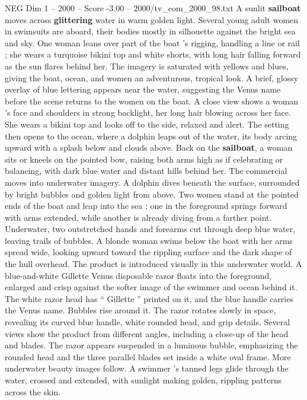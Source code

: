 \begin{textsample}{NEG Dim 1 – 2000 – Score -3.00 – 2000/tv\_com\_2000\_98.txt}  \label{ex:f1_neg_061}
A sunlit \textbf{sailboat} moves across \textbf{glittering} water in warm golden light.
Several young adult women in swimsuits are aboard, their bodies mostly in silhouette against the bright sea and sky.
One woman leans over part of the boat ’s rigging, handling a line or rail ; she wears a turquoise bikini top and white shorts, with long hair falling forward as the sun flares behind her.
The imagery is saturated with yellows and blues, giving the boat, ocean, and women an adventurous, tropical look.
A brief, glossy overlay of blue lettering appears near the water, suggesting the Venus name before the scene returns to the women on the boat.
A close view shows a woman ’s face and shoulders in strong backlight, her long hair blowing across her face.
She wears a bikini top and looks off to the side, relaxed and alert.
The setting then opens to the ocean, where a dolphin leaps out of the water, its body arcing upward with a splash below and clouds above.
Back on the \textbf{sailboat}, a woman sits or kneels on the pointed bow, raising both arms high as if celebrating or balancing, with dark blue water and distant hills behind her.
The commercial moves into underwater imagery.
A dolphin dives beneath the surface, surrounded by bright bubbles and golden light from above.
Two women stand at the pointed ends of the boat and leap into the sea ; one in the foreground springs forward with arms extended, while another is already diving from a farther point.
Underwater, two outstretched hands and forearms cut through deep blue water, leaving trails of bubbles.
A blonde woman swims below the boat with her arms spread wide, looking upward toward the rippling surface and the dark shape of the hull overhead.
The product is introduced visually in this underwater world.
A blue-and-white Gillette Venus disposable razor floats into the foreground, enlarged and crisp against the softer image of the swimmer and ocean behind it.
The white razor head has “ Gillette ” printed on it, and the blue handle carries the Venus name.
Bubbles rise around it.
The razor rotates slowly in space, revealing its curved blue handle, white rounded head, and grip details.
Several views show the product from different angles, including a close-up of the head and blades.
The razor appears suspended in a luminous bubble, emphasizing the rounded head and the three parallel blades set inside a white oval frame.
More underwater beauty images follow.
A swimmer ’s tanned legs glide through the water, crossed and extended, with sunlight making golden, rippling patterns across the skin.

\end{textsample}
